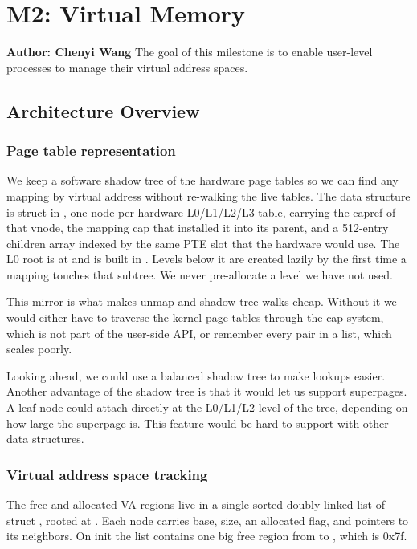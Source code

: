 \chapter*{M2: Virtual Memory}{\textbf{Author: Chenyi Wang}
\newline
 \newline
 The goal of this milestone is to enable user-level processes to manage their virtual address spaces.}
\section{Architecture Overview}
\subsection{Page table representation}

We keep a software shadow tree of the hardware page tables so we can find any
mapping by virtual address without re-walking the live tables. The data
structure is struct  in , one node per
hardware L0/L1/L2/L3 table, carrying the capref of that vnode, the mapping
cap that installed it into its parent, and a 512-entry children array
indexed by the same PTE slot that the hardware would use. The L0 root
is at  and is built in . Levels
below it are created lazily by  the first time a mapping touches
that subtree. We never pre-allocate a level we have not used.

\medskip\noindent
This mirror is what makes unmap and shadow tree walks cheap. Without it we
would either have to traverse the kernel page tables through the cap system,
which is not part of the user-side API, or remember every pair in a list, which scales poorly.

\medskip\noindent
Looking ahead, we could use a balanced shadow tree to make lookups easier. Another
advantage of the shadow tree is that it would let us support superpages. A leaf
node could attach directly at the L0/L1/L2 level of the tree, depending on how
large the superpage is. This feature would be hard to support with other data
structures.

\subsection{Virtual address space tracking}

The free and allocated VA regions live in a single sorted doubly linked list
of struct , rooted at . Each
node carries base, size, an allocated flag, and pointers to its neighbors.
On init the list contains one big free region from  to
, which is 0x7f.

